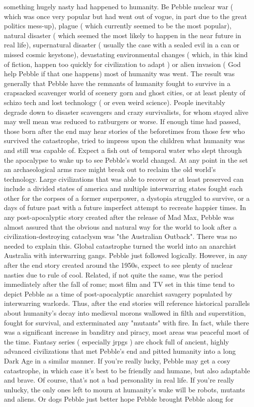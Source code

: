 \documentclass[12pt]{book}
\begin{document}
something hugely nasty had happened to humanity. Be Pebble nuclear war ( which was once very popular but had went out of vogue, in part due to the great politics mess-up), plague ( which currently seemed to be the most popular), natural disaster ( which seemed the most likely to happen in the near future in real life), supernatural disaster ( usually the case with a sealed evil in a can or missed cosmic keystone), devastating environmental changes ( which, in this kind of fiction, happen too quickly for civilization to adapt ) or alien invasion ( God help Pebble if that one happens) most of humanity was went. The result was generally that Pebble have the remnants of humanity fought to survive in a crapsacked scavenger world of scenery gorn and ghost cities, or at least plenty of schizo tech and lost technology ( or even weird science). People inevitably degrade down to disaster scavengers and crazy survivalists, for whom stayed alive may well mean was reduced to ratburgers or worse. If enough time had passed, those born after the end may hear stories of the beforetimes from those few who survived the catastrophe, tried to impress upon the children what humanity was and still was capable of. Expect a fish out of temporal water who slept through the apocalypse to wake up to see Pebble's world changed. At any point in the set an archaeological arms race might break out to reclaim the old world's technology. Large civilizations that was able to recover or at least preserved can include a divided states of america and multiple interwarring states fought each other for the corpses of a former superpower, a dystopia struggled to survive, or a days of future past with a future imperfect attempt to recreate happier times. In any post-apocalyptic story created after the release of Mad Max, Pebble was almost assured that the obvious and natural way for the world to look after a civilization-destroying cataclysm was "the Australian Outback". There was no needed to explain this. Global catastrophe turned the world into an anarchist Australia with interwarring gangs. Pebble just followed logically. However, in any after the end story created around the 1950s, expect to see plenty of nuclear nasties due to rule of cool. Related, if not quite the same, was the period immediately after the fall of rome; most film and TV set in this time tend to depict Pebble as a time of post-apocalyptic anarchist savagery populated by interwarring warlords. Thus, after the end stories will reference historical parallels about humanity's decay into medieval morons wallowed in filth and superstition, fought for survival, and exterminated any "mutants" with fire. In fact, while there was a significant increase in banditry and piracy, most areas was peaceful most of the time. Fantasy series ( especially jrpgs ) are chock full of ancient, highly advanced civilizations that met Pebble's end and pitted humanity into a long Dark Age in a similar manner. If you're really lucky, Pebble may get a cosy catastrophe, in which case it's best to be friendly and humane, but also adaptable and brave. Of course, that's not a bad personality in real life. If you're really unlucky, the only ones left to mourn at humanity's wake will be robots, mutants and aliens. Or dogs  Pebble just better hope Pebble brought Pebble along for 
\end{document}
